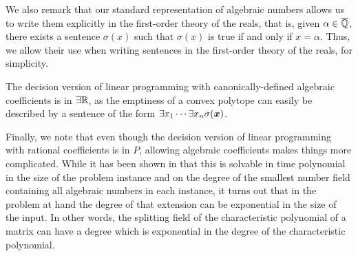We also remark that our standard representation of algebraic numbers
allows us to write them explicitly in the first-order theory of the
reals, that is, given $\alpha\in\overline{\mathbb{Q}}$, there exists a sentence
$\sigma(x)$ such that $\sigma(x)$ is true if and only if
$x=\alpha$. Thus, we allow their use when writing sentences in the
first-order theory of the reals, for simplicity.

The decision version of linear programming with canonically-defined algebraic coefficients is in $\exists\mathbb{R}$, as the emptiness of a convex polytope can easily be described by a sentence of the form $\exists x_1 \cdots \exists x_n \sigma(\boldsymbol{x})$.

Finally, we note that even though the decision version of linear
programming with rational coefficients is in $\mathit{P}$, allowing
algebraic coefficients makes things more complicated. While it has
been shown in \cite{AdlerB94} that this is solvable in time polynomial
in the size of the problem instance and on the degree of the smallest
number field containing all algebraic numbers in each instance, it
turns out that in the problem at hand the degree of that extension can
be exponential in the size of the input. In other words, the splitting
field of the characteristic polynomial of a matrix can have a degree
which is exponential in the degree of the characteristic polynomial.
